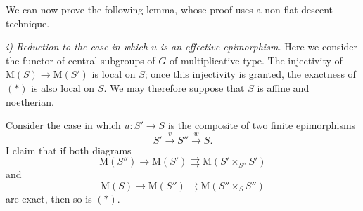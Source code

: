 We can now prove the following lemma, whose proof uses a non-flat
descent technique.


\textit{i) Reduction to the case in which \(u\) is an effective
epimorphism.}\quad
Here we consider the functor of central subgroups of \(G\) of
multiplicative type. The injectivity of
\(\mathrm M(S)\to\mathrm M(S')\) is local on \(S\); once this
injectivity is granted, the exactness of \((*)\) is also local on
\(S\). We may therefore suppose that \(S\) is affine and
noetherian.

Consider the case in which \(u:S'\to S\) is the composite of two
finite epimorphisms
\[
  S'\xrightarrow{v}S''\xrightarrow{w}S.
\]
I claim that if both diagrams
\[
  \tag{*'}\label{sga3:xv:lemma:3-7:equation:star-prime}
  \mathrm M(S'')\longrightarrow\mathrm M(S')
  \rightrightarrows\mathrm M(S'\times_{S''}S')
\]
and
\[
  \tag{*''}\label{sga3:xv:lemma:3-7:equation:star-prime-prime}
  \mathrm M(S)\longrightarrow\mathrm M(S'')
  \rightrightarrows\mathrm M(S''\times_S S'')
\]
are exact, then so is \((*)\).

